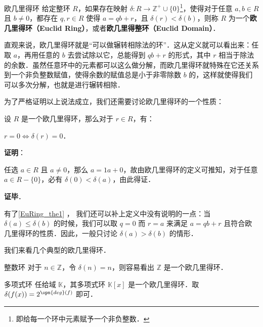 

\begin{definition}{欧几里得环}
给定整环 $R$，如果存在映射 $\delta:R\to\mathbb{Z}^+\cup\{0\}$\footnote{即给每一个环中元素赋予一个非负整数．}，使得对于任意 $a, b\in R$ 且 $b\not=0$，都存在 $q, r\in R$ 使得 $a=qb+r$，且 $\delta(r)<\delta(b)$，则称 $R$ 为一个\textbf{欧几里得环（Euclid Ring）}，或者\textbf{欧几里得整环（Euclid Domain）}．
\end{definition}



直观来说，欧几里得环就是“可以做辗转相除法的环”．这从定义就可以看出来：任取 $a$，再用任意的 $b$ 去尝试除以它，总能得到 $qb+r$ 的形式，其中 $r$ 相当于除法的余数．虽然任意环中的元素都可以这么做分解，而欧几里得环就特殊在它还关系到一个非负整数赋值，使得余数的赋值总是小于非零除数 $b$ 的，这样就使得我们可以多次分解，也就是进行辗转相除．

为了严格证明以上说法成立，我们还需要讨论欧几里得环的一个性质：

\begin{theorem}{}\label{EuRing_the1}
设 $R$ 是一个欧几里得环，那么对于 $r\in R$，有：

$r=0\iff \delta(r)=0$．
\end{theorem}

\textbf{证明}：

任选 $a\in R$ 且 $a\not=0$，那么 $a=1a+0$，故由欧几里得环的定义可推知，对于任意 $a\in R-\{0\}$，必有 $\delta(0)<\delta(a)$，由此得证．

\textbf{证毕}．

有了\autoref{EuRing_the1} ， 我们还可以补上定义中没有说明的一点：当 $\delta(a)\leq\delta(b)$ 的时候，我们可以取 $q=0$ 而 $r=a$ 来满足 $a=qb+r$ 且符合欧几里得环的性质．因此，一般只讨论 $\delta(a)>\delta(b)$ 的情形．

我们来看几个典型的欧几里得环．

\begin{example}{整数环}
对于 $n\in\mathbb{Z}$，令 $\delta(n)=n$，则容易看出 $\mathbb{Z}$ 是一个欧几里得环．
\end{example}

\begin{example}{多项式环}
任给域 $\mathbb{K}$，其多项式环 $\mathbb{K}[x]$ 是一个欧几里得环．取 $\delta(f(x))=2^{\opn{deg}(f)}$ 即可．
\end{example}

